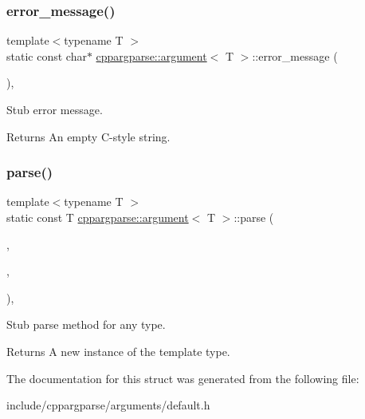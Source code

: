 \subsubsection{\texorpdfstring{error\+\_\+message()}{error\_message()}}
{\footnotesize\ttfamily template$<$typename T $>$ \\
static const char$\ast$ \hyperlink{structcppargparse_1_1argument}{cppargparse\+::argument}$<$ T $>$\+::error\+\_\+message (\begin{DoxyParamCaption}\item[{const types\+::\+Command\+Line\+Position\+\_\+t \&}]{ }\end{DoxyParamCaption})\hspace{0.3cm}{\ttfamily [inline]}, {\ttfamily [static]}}



Stub error message. 

\begin{DoxyReturn}{Returns}
An empty C-\/style string. 
\end{DoxyReturn}
\mbox{\label{structcppargparse_1_1argument_a9b5feac6fe8cf18beb63d85c0840cd84}} 
\subsubsection{\texorpdfstring{parse()}{parse()}}
{\footnotesize\ttfamily template$<$typename T $>$ \\
static const T \hyperlink{structcppargparse_1_1argument}{cppargparse\+::argument}$<$ T $>$\+::parse (\begin{DoxyParamCaption}\item[{const types\+::\+Command\+Line\+\_\+t \&}]{,  }\item[{const types\+::\+Command\+Line\+Position\+\_\+t \&}]{,  }\item[{const types\+::\+Command\+Line\+Arguments\+\_\+t \&}]{ }\end{DoxyParamCaption})\hspace{0.3cm}{\ttfamily [inline]}, {\ttfamily [static]}}



Stub parse method for any type. 

\begin{DoxyReturn}{Returns}
A new instance of the template type. 
\end{DoxyReturn}


The documentation for this struct was generated from the following file\+:\begin{DoxyCompactItemize}
\item 
include/cppargparse/arguments/default.\+h\end{DoxyCompactItemize}
